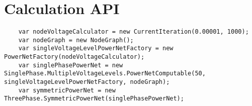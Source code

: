 \chapter{Calculation API}
\label{chap:calculation_api}

\begin{lstlisting}
	var nodeVoltageCalculator = new CurrentIteration(0.00001, 1000);
	var nodeGraph = new NodeGraph();
	var singleVoltageLevelPowerNetFactory = new PowerNetFactory(nodeVoltageCalculator);
	var singlePhasePowerNet = new SinglePhase.MultipleVoltageLevels.PowerNetComputable(50, singleVoltageLevelPowerNetFactory, nodeGraph);
	var symmetricPowerNet = new ThreePhase.SymmetricPowerNet(singlePhasePowerNet);
\end{lstlisting}